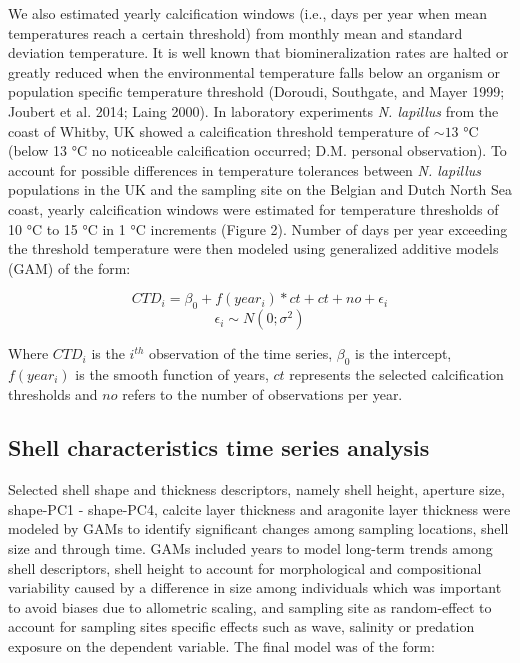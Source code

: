 \documentclass[smallextended]{svjour3}       %
\begin{document}
We also estimated yearly calcification windows (i.e., days per year when
mean temperatures reach a certain threshold) from monthly mean and
standard deviation temperature. It is well known that biomineralization
rates are halted or greatly reduced when the environmental temperature
falls below an organism or population specific temperature threshold
(Doroudi, Southgate, and Mayer 1999; Joubert et al. 2014; Laing 2000).
In laboratory experiments \emph{N. lapillus} from the coast of Whitby,
UK showed a calcification threshold temperature of \(\sim13\) °C (below
13 °C no noticeable calcification occurred; D.M. personal observation).
To account for possible differences in temperature tolerances between
\emph{N. lapillus} populations in the UK and the sampling site on the
Belgian and Dutch North Sea coast, yearly calcification windows were
estimated for temperature thresholds of 10 °C to 15 °C in 1 °C
increments (Figure 2). Number of days per year exceeding the threshold
temperature were then modeled using generalized additive models (GAM) of
the form:

\[
CTD_i = \beta_0 + f(year_i) * ct + ct + no + \epsilon_i
\] \[
\epsilon_i \sim N(0; \sigma^2)
\]

Where \(CTD_i\) is the \(i^{th}\) observation of the time series,
\(\beta_0\) is the intercept, \(f(year_i)\) is the smooth function of
years, \(ct\) represents the selected calcification thresholds and
\(no\) refers to the number of observations per year.

\hypertarget{shell-characteristics-time-series-analysis}{%
\subsection{Shell characteristics time series
analysis}\label{shell-characteristics-time-series-analysis}}

Selected shell shape and thickness descriptors, namely shell height,
aperture size, shape-PC1 - shape-PC4, calcite layer thickness and
aragonite layer thickness were modeled by GAMs to identify significant
changes among sampling locations, shell size and through time. GAMs
included years to model long-term trends among shell descriptors, shell
height to account for morphological and compositional variability caused
by a difference in size among individuals which was important to avoid
biases due to allometric scaling, and sampling site as random-effect to
account for sampling sites specific effects such as wave, salinity or
predation exposure on the dependent variable. The final model was of the
form:
\end{document}
